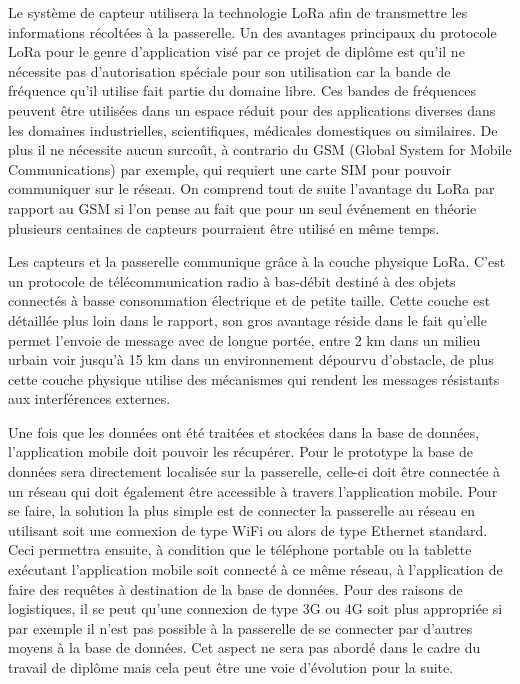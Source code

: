 Le système de capteur utilisera la technologie LoRa afin de transmettre les informations récoltées à la passerelle. Un des avantages principaux du protocole LoRa pour le genre d’application visé par ce projet de diplôme est qu’il ne nécessite pas d’autorisation spéciale pour son utilisation car la bande de fréquence qu’il utilise fait partie du domaine libre. Ces bandes de fréquences peuvent être utilisées dans un espace réduit pour des applications diverses dans les domaines industrielles, scientifiques, médicales domestiques ou similaires. De plus il ne nécessite aucun surcoût, à contrario du GSM (Global System for Mobile Communications) par exemple, qui requiert une carte SIM pour pouvoir communiquer sur le réseau. On comprend tout de suite l’avantage du LoRa par rapport au GSM si l’on pense au fait que pour un seul événement en théorie plusieurs centaines de capteurs pourraient être utilisé en même temps.

Les capteurs et la passerelle communique grâce à la couche physique LoRa. C’est un protocole de télécommunication radio à bas-débit destiné à des objets connectés à basse consommation électrique et de petite taille. Cette couche est détaillée plus loin dans le rapport, son gros avantage réside dans le fait qu’elle permet l’envoie de message avec de longue portée, entre 2 km dans un milieu urbain voir jusqu’à 15 km dans un environnement dépourvu d’obstacle, de plus cette couche physique utilise des mécanismes qui rendent les messages résistants aux interférences externes.

Une fois que les données ont été traitées et stockées dans la base de données, l’application mobile doit pouvoir les récupérer. Pour le prototype la base de données sera directement localisée sur la passerelle, celle-ci doit être connectée à un réseau qui doit également être accessible à travers l’application mobile. Pour se faire, la solution la plus simple est de connecter la passerelle au réseau en utilisant soit une connexion de type WiFi ou alors de type Ethernet standard. Ceci permettra ensuite, à condition que le téléphone portable ou la tablette exécutant l’application mobile soit connecté à ce même réseau, à l’application de faire des requêtes à destination de la base de données. Pour des raisons de logistiques, il se peut qu’une connexion de type 3G ou 4G soit plus appropriée si par exemple il n’est pas possible à la passerelle de se connecter par d’autres moyens à la base de données. Cet aspect ne sera pas abordé dans le cadre du travail de diplôme mais cela peut être une voie d’évolution pour la suite.

